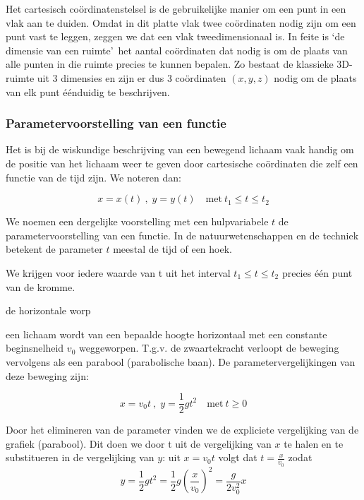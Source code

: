 Het cartesisch co\"ordinatenstelsel is de gebruikelijke manier
om een punt in een vlak aan te duiden. Omdat in dit platte vlak twee
co\"ordinaten nodig zijn om een punt vast te leggen, zeggen we dat een
vlak tweedimensionaal is. In feite is \textquoteleft de dimensie van een ruimte\textquoteright \
het aantal co\"ordinaten dat nodig is om de plaats van alle punten in
die ruimte precies te kunnen bepalen. Zo bestaat de klassieke 3D-ruimte
uit 3 dimensies en zijn er dus 3 co\"ordinaten $(x,y,z)$ nodig om de
plaats van elk punt \'e\'enduidig te beschrijven. 

\subsubsection{Parametervoorstelling van een functie}

Het is bij de wiskundige beschrijving van een bewegend lichaam
vaak handig om de positie van het lichaam weer te geven door cartesische
co\"ordinaten die zelf een functie van de tijd zijn. We noteren dan:

\begin{equation*}
x=x(t)\:,\;y=y(t)\quad\textrm{met}\:t_{1}\leq t\leq t_{2}
\end{equation*}

We noemen een dergelijke voorstelling met een hulpvariabele
$t$ de parametervoorstelling van een functie. In de natuurwetenschappen
en de techniek betekent de parameter $t$ meestal de tijd of een hoek.

We krijgen voor iedere waarde van t uit het interval $t_{1}\leq t\leq t_{2}$
precies \'e\'en punt van de kromme.


\begin{voorbeeld}
	de horizontale worp

een lichaam wordt van een bepaalde hoogte horizontaal met
een constante beginsnelheid $v_{0}$ weggeworpen. T.g.v. de zwaartekracht
verloopt de beweging vervolgens als een parabool (parabolische baan).
De parametervergelijkingen van deze beweging zijn:

\begin{equation*}
x=v_{0}t\:,\;y=\frac{1}{2}gt^{2}\quad\textrm{met}\:t\geq0
\end{equation*}


Door het elimineren van de parameter vinden we de expliciete
vergelijking van de grafiek (parabool). Dit doen we door t uit de
vergelijking van $x$ te halen en te substitueren in de vergelijking
van $y$: uit $x=v_{0}t$ volgt dat $t=\frac{x}{v_{0}}$ zodat \begin{equation*}
y=\frac{1}{2}gt^{2}=\frac{1}{2}g\left(\frac{x}{v_{0}}\right)^{2}=\frac{g}{2v_{0}^{2}}x
\end{equation*}

\end{voorbeeld}

